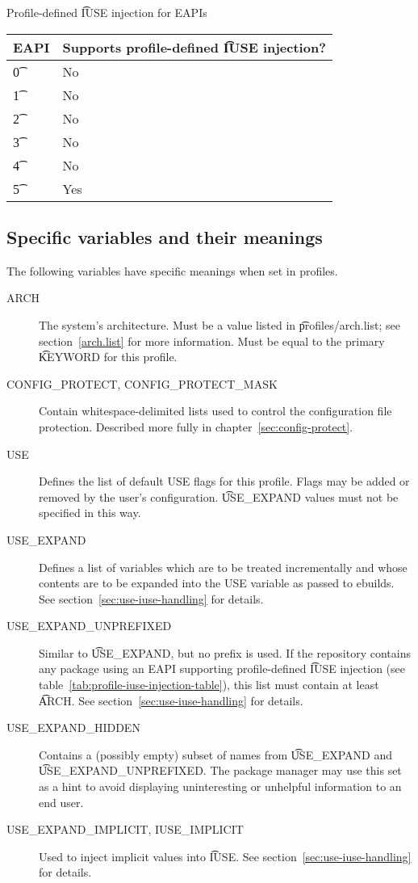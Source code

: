 \begin{centertable}{Profile-defined \t{IUSE} injection for EAPIs} \label{tab:profile-iuse-injection-table}
    \begin{tabular}{ l l }
        \toprule
        \multicolumn{1}{c}{\textbf{EAPI}} &
        \multicolumn{1}{c}{\textbf{Supports profile-defined \t{IUSE} injection?}} \\
        \midrule
    \t{0} & No \\
    \t{1} & No \\
    \t{2} & No \\
    \t{3} & No \\
    \t{4} & No \\
    \t{5} & Yes \\
    \bottomrule
    \end{tabular}
\end{centertable}

\subsection{Specific variables and their meanings}
The following variables have specific meanings when set in profiles.
\begin{description}
\item[ARCH] The system's architecture. Must be a value listed in \t{profiles/arch.list}; see
    section~\ref{arch.list} for more information. Must be equal to the primary \t{KEYWORD} for this
    profile.
\item[CONFIG\_PROTECT, CONFIG\_PROTECT\_MASK] Contain whitespace-delimited lists used to control the
    configuration file protection. Described more fully in chapter~\ref{sec:config-protect}.
\item[USE] Defines the list of default USE flags for this profile. Flags may be added or removed by
    the user's configuration. \t{USE\_EXPAND} values must not be specified in this way.
\item[USE\_EXPAND] Defines a list of variables which are to be treated incrementally and whose
    contents are to be expanded into the USE variable as passed to ebuilds. See
    section~\ref{sec:use-iuse-handling} for details.
\item[USE\_EXPAND\_UNPREFIXED] Similar to \t{USE\_EXPAND}, but no prefix is used. If the repository
    contains any package using an EAPI supporting profile-defined \t{IUSE} injection (see
    table~\ref{tab:profile-iuse-injection-table}), this list must contain at least \t{ARCH}. See
    section~\ref{sec:use-iuse-handling} for details.
\item[USE\_EXPAND\_HIDDEN] Contains a (possibly empty) subset of names from \t{USE\_EXPAND} and
    \t{USE\_EXPAND\_UNPREFIXED}. The package manager may use this set as a hint to avoid displaying
    uninteresting or unhelpful information to an end user.
\item[USE\_EXPAND\_IMPLICIT, IUSE\_IMPLICIT] Used to inject implicit values into \t{IUSE}. See
    section~\ref{sec:use-iuse-handling} for details.
\end{description}

